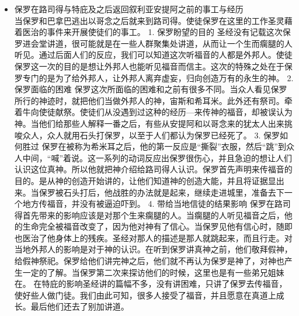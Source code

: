 \begin{itemize}
2.	保罗面临的困难
保罗所面临的困难和在彼西底安提阿的情形相似，有一群不顺从的犹太人迫害保罗，他们耸动外邦人，叫他们心里恼恨弟兄。当跟随犹太人和跟随使徒的人分党之后，外邦人和犹太人的官要凌辱保罗，并且用石头打他们。
3.	如何胜过困难
当保罗和巴拿巴受到不顺从的犹太人攻击的时候他们选择依靠主。在一个很艰难的地方，他们却在那住了多日，依靠主放胆讲道，而且他们行了很多神迹奇事来证明神的道是可信的，从而抵挡攻击。
4.	给当地信徒的结果与影响
保罗和巴拿巴应该是第一个去以哥念传福音的人，许多人第一次听福音时，生命就被改变了，接受了福音，而且这一次还有很多的希腊人接受了福音，这应该是令使徒们很欣慰的事，在当地就撒下了福音的种子。当使徒决定在那里住多日的时候，他们藉着行神迹奇事让人们信心更加坚定，从而使许多人附从他们。福音藉着使徒们的工作在当地产生了不小的影响，以至于惊动了很多的外邦人和犹太人的官长来用石头来攻击使徒保罗，如果影响不大，那些官长肯定不会管使徒们，因为使徒们工作对于他们是一种威胁，所以引来了迫害。可能是跟随使徒的人将消息报告给使徒们，他们才有机会逃出去。这表明当地信仰福音的人和使徒们的关系也有被建立起来，彼此信任。此后以哥念地区的福音工作也是这些附从了使徒的人开展的。
\item 保罗在路司得与特庇及之后返回叙利亚安提阿之前的事工与经历\\
当保罗和巴拿巴逃出以哥念之后就来到路司得。使徒保罗在这里的工作圣灵藉着医治的事件来开展使徒们的事工。
1.	保罗盼望的目的
圣经没有记载这次保罗进会堂讲道，很可能就是在一些人群聚集处讲道，从而让一个生而瘸腿的人听见。通过后面人们的反应，我们可以知道这次听福音的人都是外邦人。使徒保罗这一次的目的是想让外邦人也能听见福音而信主。这次的特殊之处在于保罗专门的是为了给外邦人，让外邦人离弃虚妄，归向创造万有的永生的神。
2.	保罗面临的困难
保罗这次所面临的困难和之前有很多不同。当众人看见保罗所行的神迹时，就把他们当做外邦人的神，宙斯和希耳米。此外还有祭司。牵着牛向使徒献祭。使徒们从没遇到过这种的经历—来传神的福音，却被误认为神。当他们给那些人解释一番之后，有些从安提阿和以哥念来的犹太人出来挑唆众人，众人就用石头打保罗，以至于人们都认为保罗已经死了。
3.	保罗如何胜过
保罗在被称为希米耳之后，他的第一反应是“撕裂”衣服，然后“跳”到众人中间，“喊”着说。这一系列的动词反应出保罗很伤心，并且急迫的想让人们认识这位真神。所以他就把神介绍给路司得人认识。保罗首先声明来传福音的目的。是从神的创造开始讲的，让他们知道神的创造大能，并且将证据显出来。当保罗被石头打后，他战胜的办法就是起来，继续走进城里，准备去下一个地方传福音，并没有被逼迫吓到。
4.	带给当地信徒的结果影响
保罗在路司得首先带来的影响应该是对那个生来瘸腿的人。当瘸腿的人听见福音之后，他的生命完全被福音改变了，因为他对神有了信心。当保罗见他有信心时，随即也医治了他身体上的残疾。圣经对那人的描述是那人就跳起来，而且行走。对当地外邦人的影响是对于神的认识。在听到保罗讲真神之前，他们敬拜假神，给假神祭祀。保罗给他们讲完神之后，他们就不再认为保罗是神了，对神也产生一定的了解。当保罗第二次来探访他们的时候，这里也是有一些弟兄姐妹在。
在特庇的影响圣经讲的篇幅不多，没有讲困难，只讲了保罗去传福音，使好些人做门徒。我们由此可知，很多人接受了福音，并且愿意在真道上成长。最后他们还去了别加讲道。
\end{itemize}

